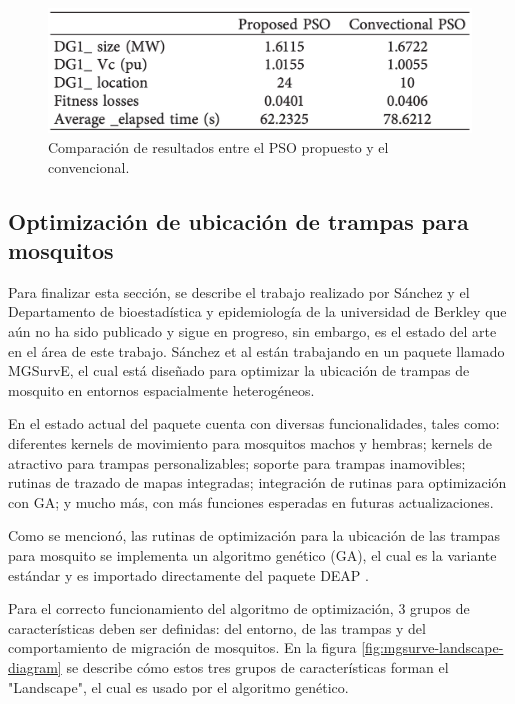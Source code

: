 \documentclass[letterpaper]{report}
\begin{document}
    \begin{figure}[ht!]
      \includegraphics[width=\textwidth]{pso-iw-variable-comp.png}
      \centering
      \caption{Comparación de resultados entre el PSO propuesto y el
        convencional.}
      \label{fig:pso-iw-variable-comp}
      \centering
    \end{figure}

  \subsection{Optimización de ubicación de trampas para mosquitos}
    \label{subsection:mgsurve}
    Para finalizar esta sección, se describe el
    trabajo realizado por Sánchez y el Departamento de bioestadística y
    epidemiología de la universidad de Berkley \cite{MGSurvE} que aún no ha sido
    publicado y sigue en progreso, sin embargo, es el estado del arte en el área
    de este trabajo. Sánchez et al están trabajando en un paquete llamado
    MGSurvE, el cual está diseñado para optimizar la ubicación de trampas de
    mosquito en entornos espacialmente heterogéneos. 

    En el estado actual del paquete cuenta con diversas funcionalidades, tales
    como: diferentes kernels de movimiento para mosquitos machos y hembras;
    kernels de atractivo para trampas personalizables; soporte para trampas
    inamovibles; rutinas de trazado de mapas integradas; integración de rutinas
    para optimización con GA; y mucho más, con más funciones esperadas en
    futuras actualizaciones.

    Como se mencionó, las rutinas de optimización para la ubicación de las
    trampas para mosquito se implementa un algoritmo genético (GA), el cual es
    la variante estándar y es importado directamente del paquete DEAP
    \cite{DEAP}.

    Para el correcto funcionamiento del algoritmo de optimización, 3 grupos de
    características deben ser definidas: del entorno, de las trampas y del
    comportamiento de migración de mosquitos. En la figura
    \ref{fig:mgsurve-landscape-diagram} se describe cómo estos tres grupos de
    características forman el "Landscape", el cual es usado por el algoritmo 
    genético. 
\end{document}

